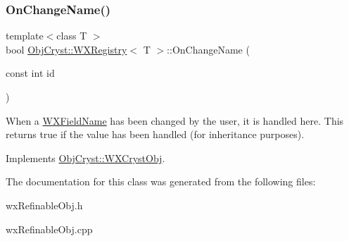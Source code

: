 \subsubsection{\texorpdfstring{OnChangeName()}{OnChangeName()}}
{\footnotesize\ttfamily template$<$class T $>$ \\
bool \mbox{\hyperlink{class_obj_cryst_1_1_w_x_registry}{Obj\+Cryst\+::\+W\+X\+Registry}}$<$ T $>$\+::On\+Change\+Name (\begin{DoxyParamCaption}\item[{const int}]{id }\end{DoxyParamCaption})\hspace{0.3cm}{\ttfamily [virtual]}}

When a \mbox{\hyperlink{class_obj_cryst_1_1_w_x_field_name}{W\+X\+Field\+Name}} has been changed by the user, it is handled here. This returns true if the value has been handled (for inheritance purposes). 

Implements \mbox{\hyperlink{class_obj_cryst_1_1_w_x_cryst_obj_a3736357599263df7e550790753c040a3}{Obj\+Cryst\+::\+W\+X\+Cryst\+Obj}}.



The documentation for this class was generated from the following files\+:\begin{DoxyCompactItemize}
\item 
wx\+Refinable\+Obj.\+h\item 
wx\+Refinable\+Obj.\+cpp\end{DoxyCompactItemize}
